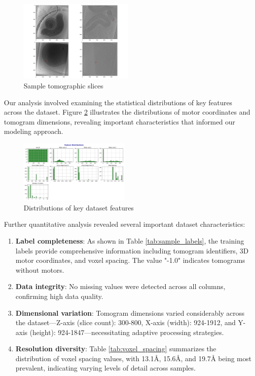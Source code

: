\documentclass{article}
\begin{document}
\begin{figure}[htb]
    \centering
    \includegraphics[width=0.5\textwidth]{images/random_training_samples.png}
    \caption{Sample tomographic slices}
    \label{fig:sample_slices}
\end{figure}

Our analysis involved examining the statistical distributions of key features across the dataset. Figure \ref{fig:feature_distributions} illustrates the distributions of motor coordinates and tomogram dimensions, revealing important characteristics that informed our modeling approach.

\begin{figure}[htb]
    \centering
    \includegraphics[width=0.48\textwidth]{images/feature_distributions.png}
    \caption{Distributions of key dataset features}
    \label{fig:feature_distributions}
\end{figure}


Further quantitative analysis revealed several important dataset characteristics:

\begin{enumerate}
    \item \textbf{Label completeness}: As shown in Table \ref{tab:sample_labels}, the training labels provide comprehensive information including tomogram identifiers, 3D motor coordinates, and voxel spacing. The value "-1.0" indicates tomograms without motors.
    \item \textbf{Data integrity}: No missing values were detected across all columns, confirming high data quality.
    \item \textbf{Dimensional variation}: Tomogram dimensions varied considerably across the dataset—Z-axis (slice count): 300-800, X-axis (width): 924-1912, and Y-axis (height): 924-1847—necessitating adaptive processing strategies.
    \item \textbf{Resolution diversity}: Table \ref{tab:voxel_spacing} summarizes the distribution of voxel spacing values, with 13.1Å, 15.6Å, and 19.7Å being most prevalent, indicating varying levels of detail across samples.
\end{enumerate}
\end{document}
